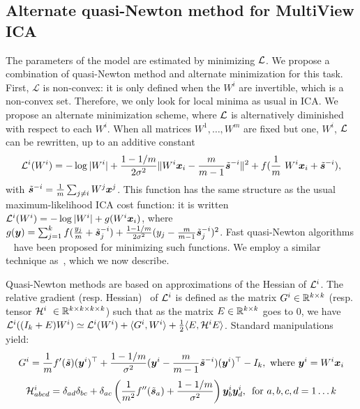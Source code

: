 \subsection{Alternate quasi-Newton method for MultiView ICA}
%
The parameters of the model are estimated by minimizing $\mathcal{L}$.
%
We propose a combination of quasi-Newton method and alternate minimization for this task.
%
First, $\mathcal{L}$ is non-convex: it is only defined when the $W^i$ are invertible, which is a non-convex set.
%
Therefore, we only look for local minima as usual in ICA.
%
We propose an alternate minimization scheme, where $\mathcal{L}$ is alternatively diminished with respect to each $W^i$. 
%
When all matrices $W^1, \dots, W^m$ are fixed but one, $W^i$, $\mathcal{L}$ can be rewritten, up to an additive constant 
\begin{equation}
    \label{eq:indiv_loss}
    \loss^i(W^i) = -\log|W^i| + \frac{1 - 1/m}{2\sigma^2}\|W^i\xb_i - \frac{m}{m-1}\tilde{\sbb}^{-i}\|^2 + f(\frac1m W^i \xb_i +\tilde{\sbb}^{-i}), 
\end{equation}
with $\tilde{\boldsymbol{s}}^{-i} = \frac1m \sum_{j \neq i}W^j \boldsymbol{x}^j$.
%
This function has the same structure as the usual maximum-likelihood ICA cost function: it is written $\mathcal{L}^i(W^i) = -\log|W^i| + g(W^i\boldsymbol{x}_i)$, where $g(\boldsymbol{y}) = \sum_{j=1}^kf(\frac{y_j}{m} + \tilde{\boldsymbol{s}}^{-i}_j) + \frac{1 - 1/m}{2\sigma^2}(y_j - \frac{m}{m-1}\tilde{\boldsymbol{s}}^{-i}_j)^2$.
%
Fast quasi-Newton algorithms ~\cite{zibulevsky2003blind, ablin2018faster} have been proposed for minimizing such functions.
%
We employ a similar technique as~\cite{zibulevsky2003blind}, which we now describe.

Quasi-Newton methods are based on approximations of the Hessian of $\mathcal{L}^i$.
%
The relative gradient (resp. Hessian)~\cite{amari1996new, cardoso1996equivariant} of $\mathcal{L}^i$ is defined as the matrix $G^i\in \mathbb{R}^{k \times k}$ (resp. tensor $\mathcal{H}^i \in \bbR^{k\times k\times k\times k}$) such that as the matrix $E\in\mathbb{R}^{k\times k}$ goes to $0$, we have $\mathcal{L}^i((I_k + E)W^i) \simeq \mathcal{L}^i(W^i) + \langle G^i, W^i\rangle + \frac12\langle E, \mathcal{H}^iE\rangle$. Standard manipulations yield:
\begin{equation}
    \label{eq:gradient}
    G^i = \frac1mf'(\tilde{\boldsymbol{s}})(\boldsymbol{y}^i)^{\top} + \frac{1 - 1 /m}{\sigma^2}(\boldsymbol{y}^i - \frac{m}{m-1}\tilde{\boldsymbol{s}}^{-i})(\boldsymbol{y}^i)^{\top} - I_k, \text{ where } \boldsymbol{y}^i= W^i\boldsymbol{x}_i
\end{equation}
\begin{equation}
    \label{eq:hessian}
    \mathcal{H}^i_{abcd} = \delta_{ad}\delta_{bc} + \delta_{ac}\left(\frac{1}{m^2}f''(\tilde{\boldsymbol{s}}_a) + \frac{1 - 1/m}{\sigma^2}\right)\boldsymbol{y}^i_{b}\boldsymbol{y}^i_d,\enspace \text{for }a, b, c, d =1\dots k
\end{equation}

